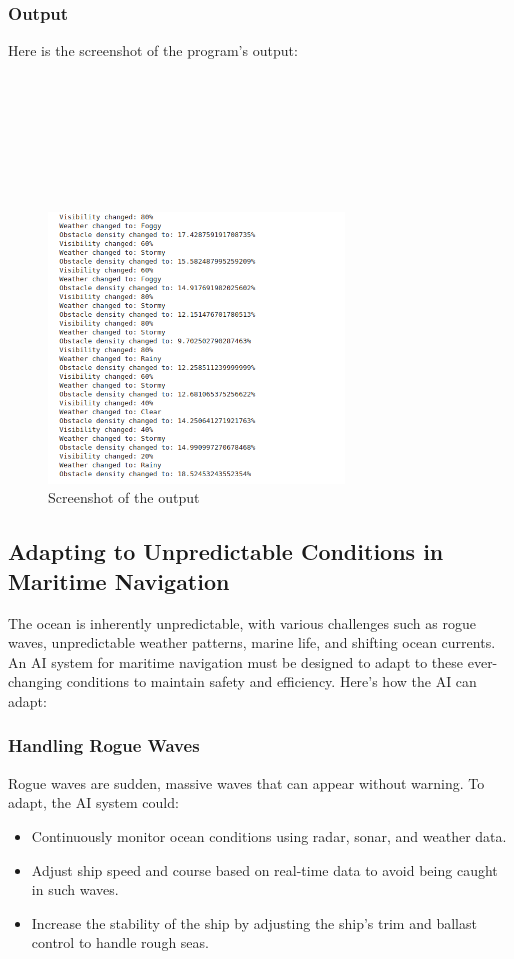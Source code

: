 \documentclass{article}
\begin{document}
\subsubsection{Output}
Here is the screenshot of the program's output:
\\ \\ \\ \\ \\ \\ \\ \\
\begin{figure}[h!]
    \centering
    \includegraphics[width=0.7\textwidth]{2_a.png} 
    \caption{Screenshot of the output}
\end{figure}
\subsection{Adapting to Unpredictable Conditions in Maritime Navigation}

The ocean is inherently unpredictable, with various challenges such as rogue waves, unpredictable weather patterns, marine life, and shifting ocean currents. An AI system for maritime navigation must be designed to adapt to these ever-changing conditions to maintain safety and efficiency. Here's how the AI can adapt:

\subsubsection{\large Handling Rogue Waves}
Rogue waves are sudden, massive waves that can appear without warning. To adapt, the AI system could:
\begin{itemize}
    \item Continuously monitor ocean conditions using radar, sonar, and weather data.
    \item Adjust ship speed and course based on real-time data to avoid being caught in such waves.
    \item Increase the stability of the ship by adjusting the ship's trim and ballast control to handle rough seas.
\end{itemize}
\end{document}
